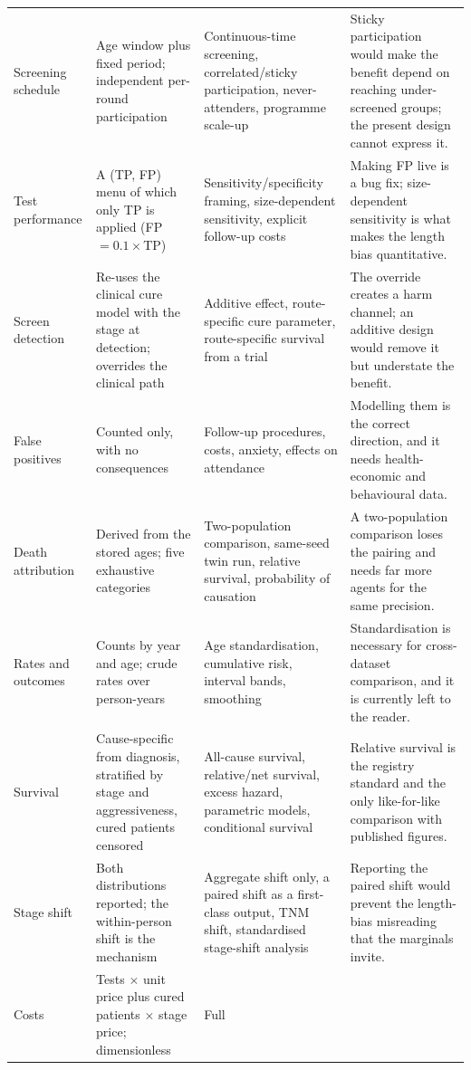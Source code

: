 \documentclass[12pt,a4paper]{article}
\begin{document}
{\begin{longtable}{@{}p{2.3cm}p{4.5cm}p{4.0cm}p{4.0cm}@{}}
Screening schedule & Age window plus fixed period; independent per-round participation & Continuous-time
screening, correlated/sticky participation, never-attenders, programme scale-up & Sticky participation would
make the benefit depend on reaching under-screened groups; the present design cannot express it. \\
Test performance & A (TP, FP) menu of which only TP is applied (FP $=0.1\times$TP) & Sensitivity/specificity
framing, size-dependent sensitivity, explicit follow-up costs & Making FP live is a bug fix;
size-dependent sensitivity is what makes the length bias quantitative. \\
Screen detection & Re-uses the clinical cure model with the stage at detection; overrides the clinical path &
Additive effect, route-specific cure parameter, route-specific survival from a trial & The override creates a
harm channel; an additive design would remove it but understate the benefit. \\
False positives & Counted only, with no consequences & Follow-up procedures, costs, anxiety, effects on
attendance & Modelling them is the correct direction, and it needs health-economic and behavioural data. \\
Death attribution & Derived from the stored ages; five exhaustive categories & Two-population comparison,
same-seed twin run, relative survival, probability of causation & A two-population comparison loses the
pairing and needs far more agents for the same precision. \\
Rates and outcomes & Counts by year and age; crude rates over person-years & Age standardisation, cumulative
risk, interval bands, smoothing & Standardisation is necessary for cross-dataset comparison, and it is
currently left to the reader. \\
Survival & Cause-specific from diagnosis, stratified by stage and aggressiveness, cured patients censored &
All-cause survival, relative/net survival, excess hazard, parametric models, conditional survival & Relative
survival is the registry standard and the only like-for-like comparison with published figures. \\
Stage shift & Both distributions reported; the within-person shift is the mechanism & Aggregate shift only, a
paired shift as a first-class output, TNM shift, standardised stage-shift analysis & Reporting the paired
shift would prevent the length-bias misreading that the marginals invite. \\
Costs & Tests $\times$ unit price plus cured patients $\times$ stage price; dimensionless & Full

\end{longtable}}
\end{document}
